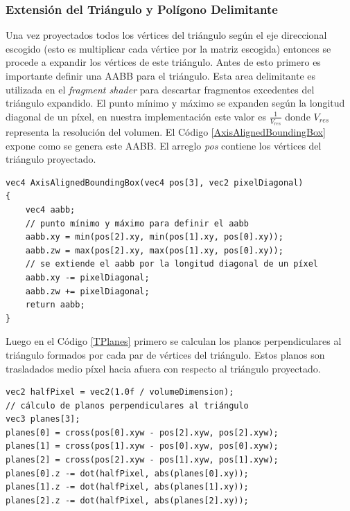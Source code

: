\subsubsection{Extensión del Triángulo y Polígono Delimitante}
Una vez proyectados todos los vértices del triángulo según el eje direccional escogido (esto es multiplicar cada vértice por la matriz escogida) entonces se procede a expandir los vértices de este triángulo. Antes de esto primero es importante definir una \ac{AABB} para el triángulo. Esta area delimitante es utilizada en el \emph{fragment shader} para descartar fragmentos excedentes del triángulo expandido. El punto mínimo y máximo se expanden según la longitud diagonal de un píxel, en nuestra implementación este valor es $\frac{1}{V_{res}}$ donde $V_{res}$ representa la resolución del volumen. El Código \ref{AxisAlignedBoundingBox} expone como se genera este \ac{AABB}.  El arreglo \emph{pos} contiene los vértices del triángulo proyectado.
\\
\begin{lstlisting}[caption={Creación de un \ac{AABB} para el triángulo proyectado.}, label=AxisAlignedBoundingBox]
vec4 AxisAlignedBoundingBox(vec4 pos[3], vec2 pixelDiagonal)
{
    vec4 aabb;
    // punto mínimo y máximo para definir el aabb
    aabb.xy = min(pos[2].xy, min(pos[1].xy, pos[0].xy));
    aabb.zw = max(pos[2].xy, max(pos[1].xy, pos[0].xy));
    // se extiende el aabb por la longitud diagonal de un píxel
    aabb.xy -= pixelDiagonal;
    aabb.zw += pixelDiagonal;
    return aabb;
}
\end{lstlisting}

Luego en el Código \ref{TPlanes} primero se calculan los planos perpendiculares al triángulo formados por cada par de vértices del triángulo. Estos planos son trasladados medio píxel hacia afuera con respecto al triángulo proyectado.
\\
\begin{lstlisting}[caption={Planos por cada par de vértices del triángulo proyectado.}, label=TPlanes]
vec2 halfPixel = vec2(1.0f / volumeDimension);
// cálculo de planos perpendiculares al triángulo
vec3 planes[3];
planes[0] = cross(pos[0].xyw - pos[2].xyw, pos[2].xyw);
planes[1] = cross(pos[1].xyw - pos[0].xyw, pos[0].xyw);
planes[2] = cross(pos[2].xyw - pos[1].xyw, pos[1].xyw);
planes[0].z -= dot(halfPixel, abs(planes[0].xy));
planes[1].z -= dot(halfPixel, abs(planes[1].xy));
planes[2].z -= dot(halfPixel, abs(planes[2].xy));
\end{lstlisting}

